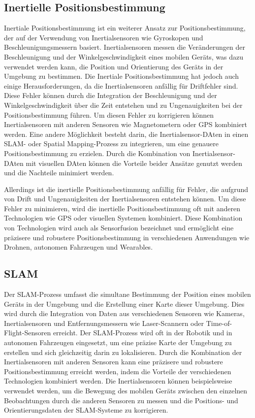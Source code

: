     \subsection{Inertielle Positionsbestimmung} \label{inertielle_positionsbestimmung:subsection}
    Inertiale Positionsbestimmung ist ein weiterer Ansatz zur Positionsbestimmung, der auf der Verwendung von Inertialsensoren wie Gyroskopen und Beschleunigungsmessern basiert. Inertialsensoren messen die Veränderungen der Beschleunigung und der Winkelgeschwindigkeit eines mobilen Geräts, was dazu verwendet werden kann, die Position und Orientierung des Geräts in der Umgebung zu bestimmen. Die Inertiale Positionsbestimmung hat jedoch auch einige Herausforderungen, da die Inertialsensoren anfällig für Driftfehler sind. Diese Fehler können durch die Integration der Beschleunigung und der Winkelgeschwindigkeit über die Zeit entstehen und zu Ungenauigkeiten bei der Positionsbestimmung führen. Um diesen Fehler zu korrigieren können Inertialsensoren mit anderen Sensoren wie Magnetometern oder GPS kombiniert werden.
    Eine andere Möglichkeit besteht darin, die Inertialsensor-DAten in einen SLAM- oder Spatial Mapping-Prozess zu integrieren, um eine genauere Positionsbestimmung zu erzielen. Durch die Kombination von Inertialsensor-DAten mit visuellen DAten können die Vorteile beider Ansätze genutzt werden und die Nachteile minimiert werden.


Allerdings ist die inertielle Positionsbestimmung anfällig für Fehler, die aufgrund von Drift und Ungenauigkeiten der Inertialsensoren entstehen können. Um diese Fehler zu minimieren, wird die inertielle Positionsbestimmung oft mit anderen Technologien wie GPS oder visuellen Systemen kombiniert. Diese Kombination von Technologien wird auch als Sensorfusion bezeichnet und ermöglicht eine präzisere und robustere Positionsbestimmung in verschiedenen Anwendungen wie Drohnen, autonomen Fahrzeugen und Wearables.

\subsection{SLAM}\label{SLAM:section} \label{positionsbestimmung:section}

Der SLAM-Prozess umfasst die simultane Bestimmung der Position eines mobilen Geräts in der Umgebung und die Erstellung einer Karte dieser Umgebung. Dies wird durch die Integration von Daten aus verschiedenen Sensoren wie Kameras, Inertialsensoren und Entfernungsmessern wie Laser-Scannern oder Time-of-Flight-Sensoren erreicht. Der SLAM-Prozess wird oft in der Robotik und in autonomen Fahrzeugen eingesetzt, um eine präzise Karte der Umgebung zu erstellen und sich gleichzeitig darin zu lokalisieren.
Durch die Kombination der Inertialsensoren mit anderen Sensoren kann eine präzisere und robustere Positionsbestimmung erreicht werden, indem die Vorteile der verschiedenen Technologien kombiniert werden. Die Inertialsensoren können beispielsweise verwendet werden, um die Bewegung des mobilen Geräts zwischen den einzelnen Beobachtungen durch die anderen Sensoren zu messen und die Positions- und Orientierungsdaten der SLAM-Systeme zu korrigieren.

